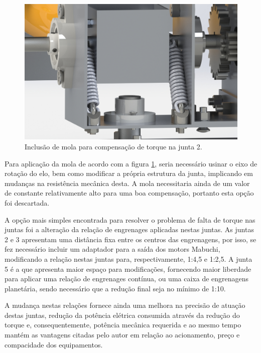 \begin{figure}[h!]
    \caption{Inclusão de mola para compensação de torque na junta 2.}    
    \begin{centering}

        \includegraphics[width=0.7\columnwidth]{images/arm/spring-cropped.jpg}
    
    \par\end{centering}

    \label{fig:mola}
\end{figure}

Para aplicação da mola de acordo com a figura \ref{fig:mola}, seria necessário
usinar o eixo de rotação do elo, bem como modificar a própria estrutura da junta, 
implicando em mudanças na resistência mecânica desta. A mola necessitaria ainda
de um valor de constante relativamente alto para uma boa compensação, portanto 
esta opção foi descartada.

A opção mais simples encontrada para resolver o problema de falta de torque nas
juntas foi a alteração da relação de engrenages aplicadas 
nestas juntas. As juntas 2 e 3 apresentam uma distância fixa entre os centros das 
engrenagens, por isso, se fez necessário incluir um adaptador para a saída dos 
motors Mabuchi, modificando a relação nestas juntas para, respectivamente, 1:4,5 e 
1:2,5. A junta 5 é a que apresenta maior espaço para modificações, fornecendo maior 
liberdade para aplicar uma relação de engrenages contínua, ou uma caixa de engrenagens
planetária, sendo necessário que a redução final seja no mínimo de 1:10.

A mudança nestas relações fornece ainda uma melhora na precisão de atuação destas 
juntas, redução da potência elétrica consumida através da redução do torque e, 
consequentemente, potência mecânica requerida e ao mesmo tempo mantém as vantagens 
citadas pelo autor em relação ao acionamento, preço e compacidade dos equipamentos.

